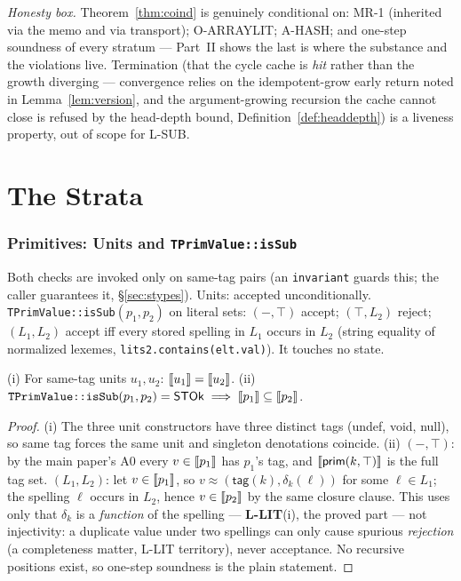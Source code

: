 \documentclass[11pt]{article}
\newcommand{\tagfn}{\mathsf{tag}}
\newcommand{\STOk}{\mathsf{STOk}}
\begin{document}
\noindent
\emph{Honesty box.} Theorem~\ref{thm:coind} is genuinely conditional on:
MR-1 (inherited
via the memo and via transport); O-ARRAYLIT; A-HASH; and one-step
soundness of every stratum --- Part~II shows the last is where the
substance and the violations live. Termination (that the cycle cache is
\emph{hit} rather than the growth diverging --- convergence relies on the
idempotent-grow early return noted in Lemma~\ref{lem:version}, and the
argument-growing recursion the cache cannot close is refused by the
head-depth bound, Definition~\ref{def:headdepth}) is a
liveness property, out of scope for L-SUB.

\part{The Strata}

\section{Primitives: Units and \texttt{TPrimValue::isSub}}
\label{sec:prim}

\begin{definition}
Both checks are invoked only on same-tag pairs (an \texttt{invariant}
guards this; the caller guarantees it, \S\ref{sec:stypes}). Units:
accepted unconditionally. \texttt{TPrimValue::isSub}$(p_1, p_2)$ on
literal sets: $(-, \top)$ accept; $(\top, L_2)$ reject; $(L_1, L_2)$
accept iff every stored spelling in $L_1$ occurs in $L_2$ (string
equality of normalized lexemes, \texttt{lits2.contains(elt.val)}).
It touches no state.
\end{definition}

\begin{lemma}
\label{lem:prim}
(i) For same-tag units $u_1, u_2$: $\llbracket u_1 \rrbracket = \llbracket u_2 \rrbracket$.
(ii) $\texttt{TPrimValue::isSub}(p_1,p_2) = \STOk \implies
\sem{p_1} \subseteq \sem{p_2}$.
\end{lemma}
\begin{proof}
(i) The three unit constructors have three distinct tags
(\textsf{undef}, \textsf{void}, \textsf{null}), so same tag forces the
same unit and singleton denotations coincide.
(ii) $(-,\top)$: by the main paper's A0 every $v \in \llbracket p_1 \rrbracket$ has
$p_1$'s tag, and $\llbracket \mathsf{prim}(k,\top) \rrbracket$ is the full tag set.
$(L_1, L_2)$: let $v \in \llbracket p_1 \rrbracket$, so $v \approx
(\tagfn(k), \delta_k(\ell))$ for some $\ell \in L_1$; the spelling
$\ell$ occurs in $L_2$, hence $v \in \llbracket p_2 \rrbracket$ by the same closure
clause. This uses only that $\delta_k$ is a \emph{function} of the
spelling --- \textbf{L-LIT}(i), the proved part --- not injectivity: a
duplicate value under two spellings can only cause spurious
\emph{rejection} (a completeness matter, L-LIT territory), never
acceptance. No
recursive positions exist, so one-step soundness is the plain statement.
\end{proof}
\end{document}

